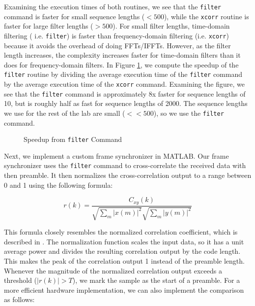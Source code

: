 \documentclass{article}
\begin{document}
\noindent Examining the execution times of both routines, we see that the \texttt{filter} command is faster for small sequence lengths ($< 500$), while the \texttt{xcorr} routine is faster for large filter lengths ($> 500$). For small filter lengths, time-domain filtering ( i.e. \texttt{filter}) is faster than frequency-domain filtering (i.e. \texttt{xcorr}) because it avoids the overhead of doing FFTs/IFFTs. However, as the filter length increases, the complexity increases faster for time-domain filters than it does for frequency-domain filters. In Figure \ref{fig::speedup}, we compute the speedup of the \texttt{filter} routine by dividing the average execution time of the \texttt{filter} command by the average execution time of the \texttt{xcorr} command. Examining the figure, we see that the \texttt{filter} command is approximately 8x faster for sequence lengths of 10, but is roughly half as fast for sequence lengths of 2000. The sequence lengths we use for the rest of the lab are small ($<< 500$), so we use the \texttt{filter} command.  

\begin{figure}[H]
	\centerline{}
	\caption{Speedup from \texttt{filter} Command}
	\label{fig::speedup}
\end{figure}

Next, we implement a custom frame synchronizer in MATLAB. Our frame synchronizer uses the \texttt{filter} command to cross-correlate the received data with then preamble. It then normalizes the cross-correlation output to a range between 0 and 1 using the following formula:

\begin{equation}
	r(k) = \frac{C_{xy}(k)}{\sqrt{\sum_m{|x(m)|^2}}\sqrt{\sum_m{|y(m)|^2}}}
\end{equation}

\noindent This formula closely resembles the normalized correlation coefficient, which is described in \cite{pearson_correlation_coefficient}. The normalization function scales the input data, so it has a unit average power and divides the resulting correlation output by the code length. This makes the peak of the correlation output 1 instead of the preamble length. Whenever the magnitude of the normalized correlation output exceeds a threshold ($|r(k)| > T$), we mark the sample as the start of a preamble. For a more efficient hardware implementation, we can also implement the comparison as follows:
\end{document}
